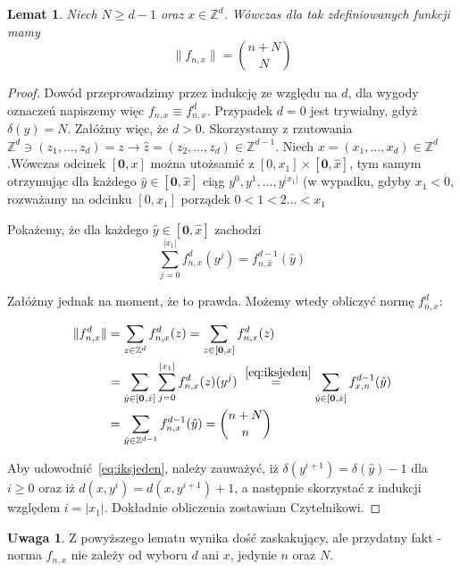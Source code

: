 \documentclass[licencjacka]{pracamgr}
\theoremstyle{definition}
\theoremstyle{definition}
\newtheorem{remark}{Uwaga}[section]
\theoremstyle{definition}
\theoremstyle{definition}
\theoremstyle{definition}
\theoremstyle{plain}
\newtheorem{lemma}{Lemat}[section]
\theoremstyle{plain}
\begin{document}
\begin{lemma}
	Niech $ N \geq d - 1 $ oraz $ x \in \mathbb{Z}^d $. Wówczas dla tak zdefiniowanych funkcji 
	mamy $$ \| f_{n,x}\|  = { n + N \choose N}$$
\end{lemma}
\begin{proof}
	Dowód przeprowadzimy przez indukcję ze względu na $ d $, dla wygody oznaczeń napiszemy 
	więc $ f_{n,x} \equiv f_{n,x}^d $. Przypadek $ d = 0 $ jest trywialny, gdyż 
	$ \delta(y) = N $. Załóżmy więc, że $ d > 0 $. Skorzystamy z rzutowania 
	$ \mathbb{Z}^d \ni (z_1, \dots, z_d) = z \rightarrow \hat z = (z_2, \dots, z_d) \in 
	\mathbb{Z}^{d-1} $.
	Niech $ x = (x_1, \dots, x_d) \in \mathbb{Z}^d $.Wówczas odcinek 
	$ [\textbf{0}, x]$ można utożsamić z $[0,x_1] \times [\textbf{0}, \hat x] $, tym 
	samym otrzymując dla każdego $ \hat y \in [\textbf{0}, \hat x] $ ciąg 
	$ y^0, y^1, \dots, y^{|x_1|} $ (w wypadku, gdyby $ x_1 < 0 $, rozważamy na odcinku 
	$ [0,x_1] $ porządek $ 0 < 1 < 2 \dots <x_1 $

	Pokażemy, że dla każdego $ \hat y \in [\textbf{0}, \hat x] $ zachodzi 
	\begin{equation} \label{eq:iksjeden}
	\sum\limits_{j = 0}^{|x_1|} f_{n,x}^d(y^j) = f^{d-1}_{n,\hat x}(\hat y)
	\end{equation}

	Załóżmy jednak na moment, że to prawda. Możemy wtedy obliczyć normę $ f_{n,x}^d $:

	\begin{align*}
		\| f^d_{n,x} \| & = \sum\limits_{z \in \mathbb{Z}^d}f^d_{n,x}(z) = 
		\sum\limits_{z \in [\textbf{0}, x]} f^d_{n,x} (z) \\
		& = \sum\limits_{\hat y \in [\textbf{0}, \hat x]} \sum\limits_{j = 0}^{|x_1|}
		f_{n,x}^d(z) (y^j) \stackrel{~\ref{eq:iksjeden}}{=} \sum\limits_{\hat y 
		\in [\textbf{0}, \hat x]} f^{d-1}_{x,n} (\hat y) \\
		& = \sum\limits_{\hat y \in \mathbb{Z}^{d-1}} f_{n,x}^{d-1} (\hat y) = 
		{n + N \choose n} 
	\end{align*}

	Aby udowodnić~\ref{eq:iksjeden}, należy zauważyć, iż 
	$ \delta (y^{i+1}) = \delta(\hat y) - 1 $ dla $ i \geq 0 $ oraz iż $ d(x,y^i) = 
	d(x, y^{i+1}) + 1 $, a następnie skorzystać z indukcji względem $ i = |x_1|$. 
	Dokładnie obliczenia zostawiam Czytelnikowi.
\end{proof}

\begin{remark}
	Z powyższego lematu wynika dość zaskakujący, ale przydatny fakt - norma 
	$ f_{n,x} $ nie zależy od wyboru $ d $ ani $ x $, jedynie $ n $ oraz $ N $.
\end{remark}
\end{document}
